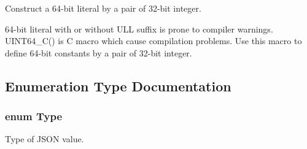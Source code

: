 Construct a 64-\/bit literal by a pair of 32-\/bit integer. 

64-\/bit literal with or without U\+LL suffix is prone to compiler warnings. U\+I\+N\+T64\+\_\+\+C() is C macro which cause compilation problems. Use this macro to define 64-\/bit constants by a pair of 32-\/bit integer. 

\subsection{Enumeration Type Documentation}
\subsubsection[{\texorpdfstring{Type}{Type}}]{\setlength{\rightskip}{0pt plus 5cm}enum {\bf Type}}\hypertarget{a00677_a1d1cfd8ffb84e947f82999c682b666a7}{}\label{a00677_a1d1cfd8ffb84e947f82999c682b666a7}


Type of J\+S\+ON value. 

